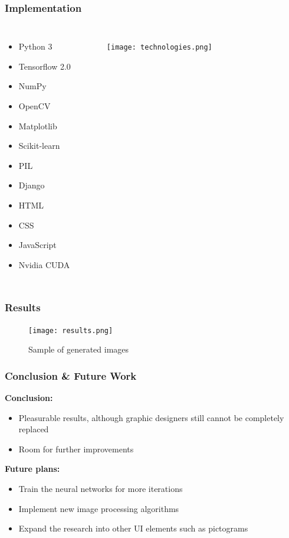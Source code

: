 \documentclass{beamer}
\begin{document}
\begin{frame}
\frametitle{Implementation}
\begin{columns}
\begin{itemize}
\item Python 3
\item Tensorflow 2.0
\item NumPy
\item OpenCV
\item Matplotlib
\item Scikit-learn
\item PIL
\item Django
\item HTML
\item CSS
\item JavaScript
\item Nvidia CUDA
\end{itemize}
\begin{figure}[ht]
    \texttt{[image: technologies.png]}
    \label{fig:python}
\end{figure}
\end{columns}
\end{frame}

\begin{frame}
\frametitle{Results}
\begin{figure}[ht]
    \texttt{[image: results.png]}
    \caption{Sample of generated images}
    \label{fig:results}
\end{figure}
\end{frame}

\begin{frame}
\frametitle{Conclusion \& Future Work}
{\bf Conclusion:}
\bigbreak
\begin{itemize}
\item Pleasurable results, although graphic designers still cannot be completely replaced
\item Room for further improvements
\end{itemize}
\bigbreak
{\bf Future plans:}
\begin{itemize}
\item Train the neural networks for more iterations
\item Implement new image processing algorithms
\item Expand the research into other UI elements such as pictograms
\end{itemize}
\end{frame}
\end{document}
